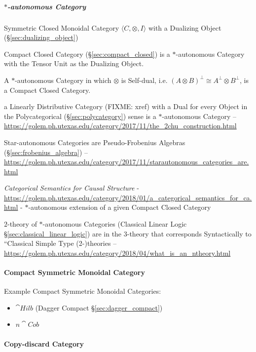 \subparagraph{$*$-autonomous Category}\label{sec:star_autonomous}\hfill

Symmetric Closed Monoidal Category $\langle C, \otimes, I \rangle$
with a Dualizing Object (\S\ref{sec:dualizing_object})

Compact Closed Category (\S\ref{sec:compact_closed}) is a
$*$-autonomous Category with the Tensor Unit as the Dualizing Object.

A $*$-autonomous Category in which $\otimes$ is Self-dual, i.e. $(A
\otimes B)^\bot \cong A^\bot \otimes B^\bot$, is a Compact Closed
Category. \cite{abramsky-gay-nagarajan96}

a Linearly Distributive Category (FIXME: xref) with a Dual for every Object in
the Polycategorical (\S\ref{sec:polycategory}) sense is a $*$-autonomous
Category
--\url{https://golem.ph.utexas.edu/category/2017/11/the_2chu_construction.html}

Star-autonomous Categories are Pseudo-Frobenius Algebras
(\S\ref{sec:frobenius_algebra})
--\url{https://golem.ph.utexas.edu/category/2017/11/starautonomous_categories_are.html}

\emph{Categorical Semantics for Causal Structure} -
\url{https://golem.ph.utexas.edu/category/2018/01/a_categorical_semantics_for_ca.html}
- $*$-autonomous extension of a given Compact Closed Category

$2$-theory of $*$-autonomous Categories (Classical Linear Logic
\S\ref{sec:classical_linear_logic}) are in the $3$-theory that corresponds
Syntactically to ``Classical Simple Type (2-)theories --
\url{https://golem.ph.utexas.edu/category/2018/04/what_is_an_ntheory.html}



\paragraph{Compact Symmetric Monoidal Category}
\label{sec:compact_symmetric_monoidal}\hfill

Example Compact Symmetric Monoidal Categories:

\begin{itemize}
\item $\cat{Hilb}$ (Dagger Compact \S\ref{sec:dagger_compact})
\item $n\cat{Cob}$
\end{itemize}



\paragraph{Copy-discard Category}\label{sec:cd_category}\hfill

